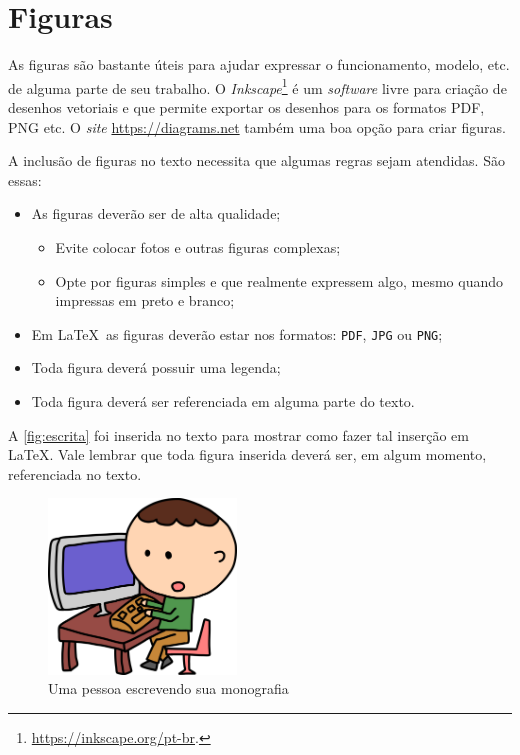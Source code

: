 \section{Figuras}\label{sec:figuras}

As figuras são bastante úteis para ajudar expressar o funcionamento, modelo, etc. de alguma parte de seu trabalho. O \textit{Inkscape}\footnote{\url{https://inkscape.org/pt-br}.} é um \textit{software} livre para criação de desenhos vetoriais e que permite exportar os desenhos para os formatos PDF, PNG etc. O \textit{site} \url{https://diagrams.net} também uma boa opção para criar figuras.

A inclusão de figuras no texto necessita que algumas regras sejam atendidas. São essas:

\begin{itemize}
    \item As figuras deverão ser de alta qualidade;
          \begin{itemize}
              \item Evite colocar fotos e outras figuras complexas;
              \item Opte por figuras simples e que realmente expressem algo, mesmo quando impressas em preto e branco;
          \end{itemize}
    \item Em \LaTeX~as figuras deverão estar nos formatos: \texttt{PDF}, \texttt{JPG} ou \texttt{PNG};
    \item Toda figura deverá possuir uma legenda;
    \item Toda figura deverá ser referenciada em alguma parte do texto.
\end{itemize}

A \autoref{fig:escrita} foi inserida no texto para mostrar como fazer tal inserção em \LaTeX. Vale lembrar que toda figura inserida deverá ser, em algum momento, referenciada no texto.

\begin{figure}[ht]
    \centering
    \caption{Uma pessoa escrevendo sua monografia}\label{fig:escrita}
    \includegraphics[width=5cm]{figuras/man}
\end{figure}



